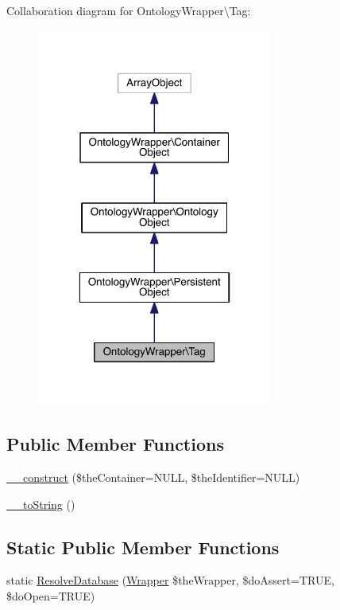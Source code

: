 Collaboration diagram for Ontology\-Wrapper\textbackslash{}Tag\-:
\nopagebreak
\begin{figure}[H]
\begin{center}
\leavevmode
\includegraphics[width=220pt]{class_ontology_wrapper_1_1_tag__coll__graph}
\end{center}
\end{figure}
\subsection*{Public Member Functions}
\begin{DoxyCompactItemize}
\item 
\hyperlink{class_ontology_wrapper_1_1_tag_aa1e0088ed61d741f3679c3a3128007b1}{\-\_\-\-\_\-construct} (\$the\-Container=N\-U\-L\-L, \$the\-Identifier=N\-U\-L\-L)
\item 
\hyperlink{class_ontology_wrapper_1_1_tag_a38eb887959321b660131324966f16193}{\-\_\-\-\_\-to\-String} ()
\end{DoxyCompactItemize}
\subsection*{Static Public Member Functions}
\begin{DoxyCompactItemize}
\item 
static \hyperlink{class_ontology_wrapper_1_1_tag_ac072dd2cabcf5bf938547890620e0446}{Resolve\-Database} (\hyperlink{class_ontology_wrapper_1_1_wrapper}{Wrapper} \$the\-Wrapper, \$do\-Assert=T\-R\-U\-E, \$do\-Open=T\-R\-U\-E)
\end{DoxyCompactItemize}
